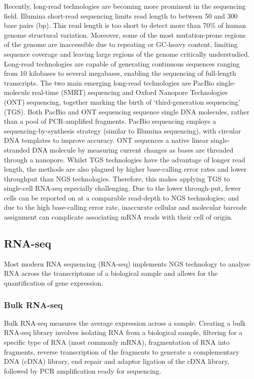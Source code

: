 Recently, long-read technologies are becoming more prominent in the sequencing field.
Illumina short-read sequencing limits read length to between 50 and 300 base pairs (bp)\@.
This read length is too short to detect more than 70\% of human genome structural variation.
Moreover, some of the most mutation-prone regions of the genome are inaccessible due to repeating or GC-heavy content, limiting sequence coverage and leaving large regions of the genome critically understudied\cite{logsdon2020long}.
Long-read technologies are capable of generating continuous sequences ranging from 10 kilobases to several megabases, enabling the sequencing of full-length transcripts.
The two main emerging long-read technologies are PacBio single-molecule real-time (SMRT) sequencing\cite{wenger2019accurate} and Oxford Nanopore Technologies (ONT) sequencing\cite{ip2015minion, jain2016oxford}, together marking the birth of `third-generation sequencing' (TGS).
Both PacBio and ONT sequencing sequence single DNA molecules, rather than a pool of PCR-amplified fragments.
PacBio sequencing employs a sequencing-by-synthesis strategy (similar to Illumina sequencing), with circular DNA templates to improve accuracy.
ONT sequences a native linear single-stranded DNA molecule by measuring current changes as bases are threaded through a nanopore\cite{weirather2017comprehensive}.
Whilst TGS technologies have the advantage of longer read length, the methods are also plagued by higher base-calling error rates and lower throughput than NGS technologies\cite{weirather2017comprehensive, philpott2021nanopore}.
Therefore, this makes applying TGS to single-cell RNA-seq especially challenging.
Due to the lower through-put, fewer cells can be reported on at a comparable read-depth to NGS technologies;
and due to the high base-calling error rate, inaccurate cellular and molecular barcode assignment can complicate associating mRNA reads with their cell of origin.

\subsection{RNA-seq}\label{subsec:rna-seq-intro}
Most modern RNA sequencing (RNA-seq) implements NGS technology to analyse RNA across the transcriptome of a biological sample and allows for the quantification of gene expression.

\subsubsection{Bulk RNA-seq}
Bulk RNA-seq measures the average expression across a sample.
Creating a bulk RNA-seq library involves isolating RNA from a biological sample, filtering for a specific type of RNA (most commonly mRNA), fragmentation of RNA into fragments, reverse transcription of the fragments to generate a complementary DNA (cDNA) library, end repair and adaptor ligation of the cDNA library, followed by PCR amplification ready for sequencing.

